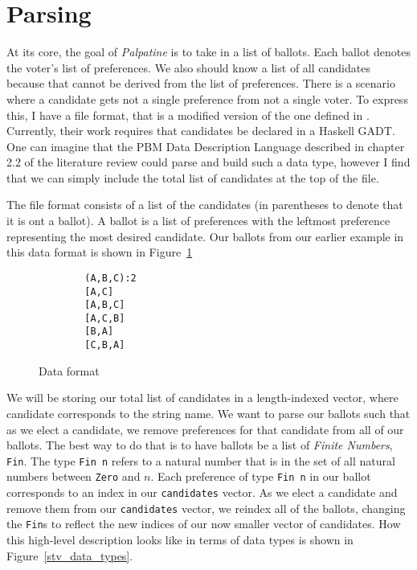\section{Parsing}

At its core, the goal of \textit{Palpatine} is to take in a list of ballots.
Each ballot denotes the voter's list of preferences. We also should know a list
of all candidates because that cannot be derived from the list of preferences.
There is a scenario where a candidate gets not a single preference from not a
single voter. To express this, I have a file format, that is a modified version
of the one defined in \cite{stv_haskell}. Currently, their work requires that
candidates be declared in a Haskell GADT. One can imagine that the PBM Data
Description Language described in chapter 2.2 of the literature review could
parse and build such a data type, however I find that we can simply include the
total list of candidates at the top of the file. 

The file format consists of a list of the candidates (in parentheses to denote
that it is ont a ballot). A ballot is a list of preferences with the leftmost
preference representing the most desired candidate. Our ballots from our earlier
example in this data format is shown in Figure~\ref{stv_format}

\begin{figure}[ht!!!!!!!]
    \caption{Data format}
    \label{stv_format}
    \begin{lstlisting}
        (A,B,C):2
        [A,C]
        [A,B,C]
        [A,C,B]
        [B,A]
        [C,B,A]
    \end{lstlisting}
\end{figure}

We will be storing our total list of candidates in a length-indexed vector,
where candidate corresponds to the string name. We want to parse our ballots
such that as we elect a candidate, we remove preferences for that candidate from
all of our ballots. The best way to do that is to have ballots be a list of
\textit{Finite Numbers}, \texttt{Fin}. The type \texttt{Fin n} refers to a
natural number that is in the set of all natural numbers between \texttt{Zero}
and $n$. Each preference of type \texttt{Fin n} in our ballot corresponds to an
index in our \texttt{candidates} vector. As we elect a candidate and remove them
from our \texttt{candidates} vector, we reindex all of the ballots, changing the
\texttt{Fin}s to reflect the new indices of our now smaller vector of
candidates. How this high-level description looks like in terms of data types is
shown in Figure~\ref{stv_data_types}.

